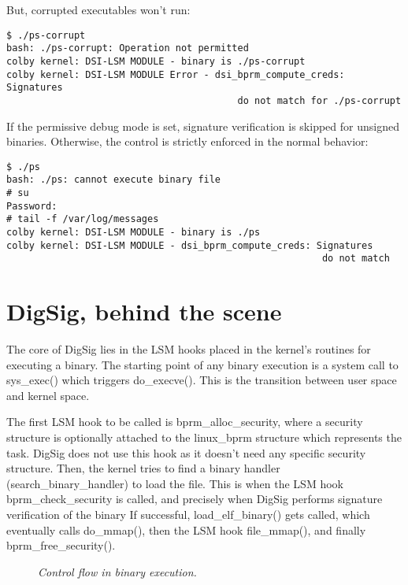 \documentclass{article}
\begin{document}
But, corrupted executables won't run:
\begin{verbatim} 
$ ./ps-corrupt
bash: ./ps-corrupt: Operation not permitted 
colby kernel: DSI-LSM MODULE - binary is ./ps-corrupt
colby kernel: DSI-LSM MODULE Error - dsi_bprm_compute_creds: Signatures 
                                         do not match for ./ps-corrupt
\end{verbatim} 

If the permissive debug mode is set, signature verification is skipped
for unsigned binaries.  Otherwise, the control is strictly enforced in
the normal behavior:

\begin{verbatim} 
$ ./ps
bash: ./ps: cannot execute binary file 
# su 
Password: 
# tail -f /var/log/messages
colby kernel: DSI-LSM MODULE - binary is ./ps
colby kernel: DSI-LSM MODULE - dsi_bprm_compute_creds: Signatures 
                                                        do not match
\end{verbatim} 

\section{DigSig, behind the scene}

The core of DigSig lies in the LSM hooks placed in the kernel's
routines for executing a binary. The starting point of any binary
execution is a system call to sys\_exec() which triggers
do\_execve(). This is the transition between user space and kernel
space.

The first LSM hook to be called is bprm\_alloc\_security,
where a security structure is optionally attached to the
linux\_bprm structure which represents the task. DigSig
does not use this hook as it doesn't need any specific
security structure.
Then, the kernel tries to find a binary handler 
(search\_binary\_handler) to load the file. This is
when the LSM hook bprm\_check\_security is called, and precisely
when DigSig performs signature verification of the binary
If successful, load\_elf\_binary() gets called,
which eventually calls do\_mmap(), then the LSM hook
file\_mmap(), and finally bprm\_free\_security().


\begin{figure}[h]
\begin{center}
\epsfxsize=12cm 
\caption{{\it Control flow in binary execution. }}
\label{fig1}
\end{center}
\end{figure}
\end{document}
